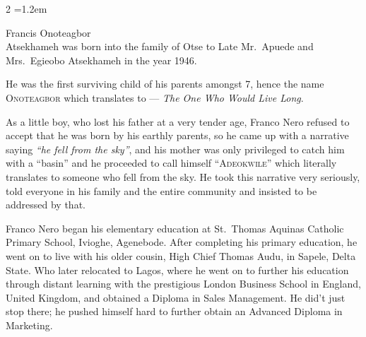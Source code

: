 \begin{multicols}{2}
  \small
  \setlength{\parindent}{1.2em}
  \setlength{\parskip}{0.5pt}
  \raggedcolumns
  \color{primary}
  \emergencystretch=1.2em


   Francis Onoteagbor \\Atsekhameh was born into the family
  of Otse to Late Mr.\ Apuede and Mrs.\ Egieobo Atsekhameh in the year 1946.

  He was the first surviving child of his parents amongst 7, hence the name
  \textsc{Onoteagbor} which translates to --- \textit{The One Who Would Live
  Long}.\smallskip

  As a little boy, who lost his father at a very tender age, Franco
  Nero refused to accept that he was born by his earthly parents, so he came
  up with a narrative saying \textit{``he fell from the sky''}, and his mother was only
  privileged to catch him with a ``basin'' and he proceeded to call himself
  ``\textsc{Adeokwile}'' which literally translates to someone who fell from
  the sky. He took this narrative very seriously, told everyone in his family
  and the entire community and insisted to be addressed by that.



  Franco Nero began his elementary education at St.\ Thomas Aquinas Catholic
  Primary School, Ivioghe, Agenebode. After completing his primary education,
  he went on to live with his older cousin, High Chief Thomas Audu, in Sapele,
  Delta State. Who later relocated to Lagos, where he went on to further his
  education through distant learning with the prestigious London Business
  School in England, United Kingdom, and obtained a Diploma in Sales
  Management. He did't just stop there; he pushed himself hard to further obtain an Advanced Diploma in Marketing.



\end{multicols}
